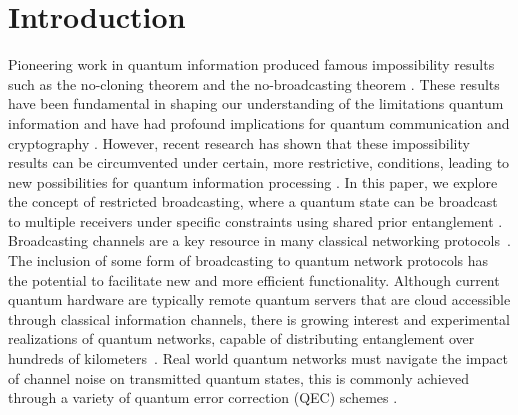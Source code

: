 
\maketitle

\section{Introduction \label{Introduction}}
Pioneering work in quantum information produced famous impossibility results such as the no-cloning theorem \cite{wootters2009no} and the no-broadcasting theorem \cite{barnum2007generalized}. These results have been fundamental in shaping our understanding of the limitations quantum information and have had profound implications for quantum communication and cryptography \cite{vsupic2020self}. However, recent research has shown that these impossibility results can be circumvented under certain, more restrictive, conditions, leading to new possibilities for quantum information processing \cite{larasati2025towards,zhang2025efficient,sukeno2025quantum,andronikos2023one}. In this paper, we explore the concept of restricted broadcasting, where a quantum state can be broadcast to multiple receivers under specific constraints using shared prior entanglement \cite{PhysRevA.105.042611}.
\\

Broadcasting channels are a key resource in many classical networking protocols~\cite{chang1984reliable}. The inclusion of some form of broadcasting to quantum network protocols has the potential to facilitate new and more efficient functionality. Although current quantum hardware are typically remote quantum servers that are cloud accessible through classical information channels, there is growing interest and experimental realizations of quantum networks, capable of distributing entanglement over hundreds of kilometers~\cite{simon2017towards, pompili2021realization, neumann2022continuous}. Real world quantum networks must navigate the impact of channel noise on transmitted quantum states, this is commonly achieved through a variety of quantum error correction (QEC) schemes \cite{gottesman1997stabilizer}.
\\

